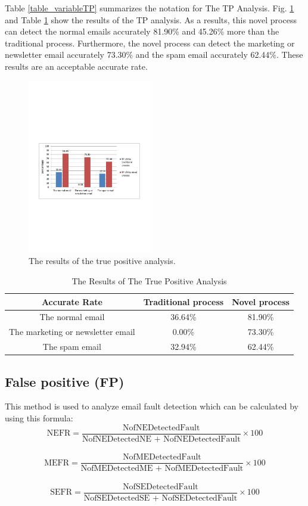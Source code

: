 \documentclass[conference]{IEEEtran}
\begin{document}
Table \ref{table_variableTP} summarizes the notation for The TP Analysis.
%
Fig. \ref{fig:resultTP} and Table \ref{table_resultsTP} show the results of the TP analysis.
%
As a results, this novel process can detect the normal emails accurately 81.90\% and 45.26\% more than the traditional process.
%
Furthermore, the novel process can detect the marketing or newsletter email accurately 73.30\% and the spam email accurately 62.44\%.
%
These results are an acceptable accurate rate.

\begin{figure}
\centering
\includegraphics[width=0.48\textwidth]{8.pdf}
\caption{The results of the true positive analysis.}
\label{fig:resultTP}
\end{figure}

\begin{table}[!t]
\renewcommand{\arraystretch}{1.2}
\caption{The Results of The True Positive Analysis}
\label{table_resultsTP}
\centering
\begin{tabular}{c|c|c}
\hline
\bfseries Accurate Rate & \bfseries Traditional process & \bfseries Novel process\\
\hline
The normal email & 36.64\% & 81.90\%\\
\hline
The marketing or newsletter email & 0.00\% & 73.30\%\\
\hline
The spam email & 32.94\% & 62.44\%\\
\hline
\end{tabular}
\end{table}

\subsection{False positive (FP)}
This method is used to analyze email fault detection which can be calculated by using this formula:\\
$$ \text{NEFR} =  \frac{\text{NofNEDetectedFault}}{\text{NofNEDetectedNE + NofNEDetectedFault}} \times 100 $$\\
$$ \text{MEFR} =  \frac{\text{NofMEDetectedFault}}{\text{NofMEDetectedME + NofMEDetectedFault}} \times 100 $$\\
$$ \text{SEFR} =  \frac{\text{NofSEDetectedFault}}{\text{NofSEDetectedSE + NofSEDetectedFault}} \times 100 $$\\
\end{document}
